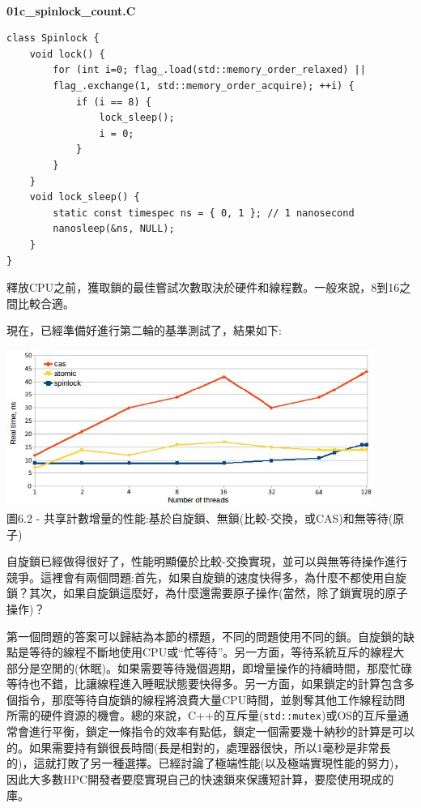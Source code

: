 \hspace*{\fill} \\ %
\noindent
\textbf{01c\_spinlock\_count.C}
\begin{lstlisting}[style=styleCXX]
class Spinlock {
	void lock() {
		for (int i=0; flag_.load(std::memory_order_relaxed) ||
		flag_.exchange(1, std::memory_order_acquire); ++i) {
			if (i == 8) {
				lock_sleep();
				i = 0;
			}
		}
	}
	void lock_sleep() {
		static const timespec ns = { 0, 1 }; // 1 nanosecond
		nanosleep(&ns, NULL);
	}
}
\end{lstlisting}

釋放CPU之前，獲取鎖的最佳嘗試次數取決於硬件和線程數。一般來說，8到16之間比較合適。

現在，已經準備好進行第二輪的基準測試了，結果如下:

\begin{center}
\includegraphics[width=0.9\textwidth]{content/2/chapter6/images/2.jpg}\\
圖6.2 - 共享計數增量的性能:基於自旋鎖、無鎖(比較-交換，或CAS)和無等待(原子)
\end{center}

自旋鎖已經做得很好了，性能明顯優於比較-交換實現，並可以與無等待操作進行競爭。這裡會有兩個問題:首先，如果自旋鎖的速度快得多，為什麼不都使用自旋鎖？其次，如果自旋鎖這麼好，為什麼還需要原子操作(當然，除了鎖實現的原子操作)？

第一個問題的答案可以歸結為本節的標題，不同的問題使用不同的鎖。自旋鎖的缺點是等待的線程不斷地使用CPU或“忙等待”。另一方面，等待系統互斥的線程大部分是空閒的(休眠)。如果需要等待幾個週期，即增量操作的持續時間，那麼忙碌等待也不錯，比讓線程進入睡眠狀態要快得多。另一方面，如果鎖定的計算包含多個指令，那麼等待自旋鎖的線程將浪費大量CPU時間，並剝奪其他工作線程訪問所需的硬件資源的機會。總的來說，C++的互斥量(\texttt{std::mutex})或OS的互斥量通常會進行平衡，鎖定一條指令的效率有點低，鎖定一個需要幾十納秒的計算是可以的。如果需要持有鎖很長時間(長是相對的，處理器很快，所以1毫秒是非常長的)，這就打敗了另一種選擇。已經討論了極端性能(以及極端實現性能的努力)，因此大多數HPC開發者要麼實現自己的快速鎖來保護短計算，要麼使用現成的庫。

